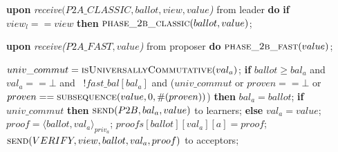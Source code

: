 \begin{algorithm}
\begin{algorithmic}[1]
		\State
		\State \textbf{upon} \textit{receive$(P2A\_CLASSIC, ballot, view, value$)} from leader \textbf{do}
		\State \hspace{\algorithmicindent} \textbf{if} $view_l == view$ \textbf{then}
		\State \hspace{\algorithmicindent}\hspace{\algorithmicindent} $\Call{phase\_2b\_classic}{ballot, value}$; 
		
		\State		
		\State \textbf{upon} \textit{receive($P2A\_FAST, value$)} from proposer \textbf{do}
		\State \hspace{\algorithmicindent} $\Call{phase\_2b\_fast}{value}$;
	
		\State
		\State $univ\_commut = \Call{isUniversallyCommutative}{val_a}$;
		\State \textbf{if} $ballot \geq bal_a$ and $val_a ==  \bot$ and \ $!fast\_bal[bal_a]$ and ($univ\_commut$ or $proven == \bot$ or $proven == \Call{subsequence}{value, 0, \#(proven)}$) \textbf{then}
		\State \hspace{\algorithmicindent} $bal_a = ballot$;
		\State \hspace{\algorithmicindent} \textbf{if} $univ\_commut$ \textbf{then}
		\State \hspace{\algorithmicindent}\hspace{\algorithmicindent} $\Call{send}{P2B,bal_a, value}$ to learners;
		\State \hspace{\algorithmicindent} \textbf{else} 
		\State \hspace{\algorithmicindent}\hspace{\algorithmicindent} $val_a = value$;
		\State \hspace{\algorithmicindent}\hspace{\algorithmicindent} $proof = \langle ballot, val_a \rangle_{priv_a}$;
		\State \hspace{\algorithmicindent}\hspace{\algorithmicindent} $proofs[ballot][val_a][a] = proof$;
		\State \hspace{\algorithmicindent}\hspace{\algorithmicindent} $\Call{send}{VERIFY, view, ballot, val_a, proof}$ to acceptors;
		\EndFunction
		

\end{algorithmic}
\end{algorithm}
